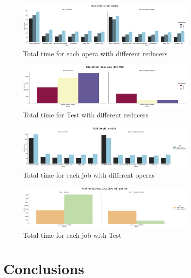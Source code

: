\documentclass[a4paper, 12pt]{article}
\begin{document}
\begin{figure}[ht!]
  \centering
  \includegraphics[width=0.8\textwidth]{media/performance/total_time_S_per_opera.png}
  \caption{Total time for each opera with different reducers}
  \label{fig:TimeOperas}
\end{figure}

\begin{figure}[ht!]
  \centering
  \includegraphics[width=0.8\textwidth]{media/performance/total_time_S_per_opera(TEST).png}
  \caption{Total time for Test with different reducers}
  \label{fig:TimeTest}
\end{figure}

\begin{figure}[ht!]
  \centering
  \includegraphics[width=0.8\textwidth]{media/performance/total_time_S_per_job.png}
  \caption{Total time for each job with different operas}
  \label{fig:TimeJob}
\end{figure}

\begin{figure}[ht!]
  \centering
  \includegraphics[width=0.8\textwidth]{media/performance/total_time_S_per_job(TEST).png}
  \caption{Total time for each job with Test}
  \label{fig:TimeJobTest}
\end{figure}

\section{Conclusions}
\end{document}
